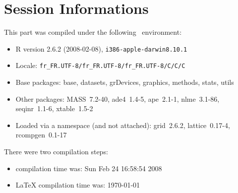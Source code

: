 \documentclass{article}
\begin{document}
\section*{Session Informations}

This part was compiled under the following \Rlogo{}~environment:

\begin{itemize}
  \item R version 2.6.2 (2008-02-08), \verb|i386-apple-darwin8.10.1|
  \item Locale: \verb|fr_FR.UTF-8/fr_FR.UTF-8/fr_FR.UTF-8/C/C/C|
  \item Base packages: base, datasets, grDevices, graphics, methods,
    stats, utils
  \item Other packages: MASS~7.2-40, ade4~1.4-5, ape~2.1-1,
    nlme~3.1-86, seqinr~1.1-6, xtable~1.5-2
  \item Loaded via a namespace (and not attached): grid~2.6.2,
    lattice~0.17-4, rcompgen~0.1-17
\end{itemize}
There were two compilation steps:

\begin{itemize}
  \item \Rlogo{} compilation time was: Sun Feb 24 16:58:54 2008
  \item \LaTeX{} compilation time was: \today
\end{itemize}


\clearpage
{}


\end{document}

